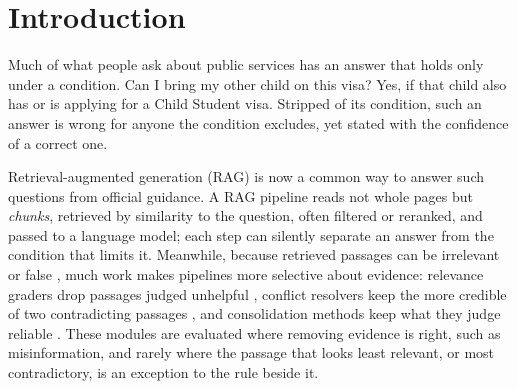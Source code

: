 \section{{Introduction}}

Much of what people ask about public services has an answer that holds only under a condition. Can I bring my other child on this visa? Yes, if that child also has or is applying for a Child Student visa. Stripped of its condition, such an answer is wrong for anyone the condition excludes, yet stated with the confidence of a correct one.

Retrieval-augmented generation (RAG) \cite{lewis2020rag} is now a common way to answer such questions from official guidance. A RAG pipeline reads not whole pages but \emph{chunks}, retrieved by similarity to the question, often filtered or reranked, and passed to a language model; each step can silently separate an answer from the condition that limits it. Meanwhile, because retrieved passages can be irrelevant or false \cite{xu2024survey}, much work makes pipelines more selective about evidence: relevance graders drop passages judged unhelpful \cite{yan2024crag}, conflict resolvers keep the more credible of two contradicting passages \cite{conflictrag2026}, and consolidation methods keep what they judge reliable \cite{wang2025astute}. These modules are evaluated where removing evidence is right, such as misinformation, and rarely where the passage that looks least relevant, or most contradictory, is an exception to the rule beside it.

